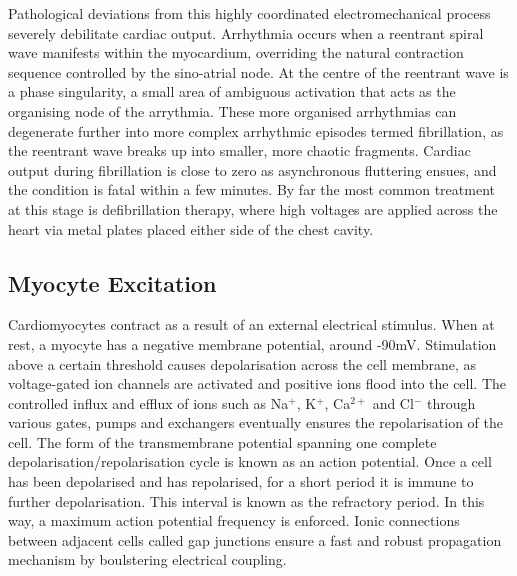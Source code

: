     Pathological deviations from this highly coordinated electromechanical process severely debilitate cardiac output. Arrhythmia occurs when a reentrant spiral wave manifests within the myocardium, overriding the natural contraction sequence controlled by the sino-atrial node. At the centre of the reentrant wave is a phase singularity, a small area of ambiguous activation that acts as the organising node of the arrythmia. These more organised arrhythmias can degenerate further into more complex arrhythmic episodes termed fibrillation, as the reentrant wave breaks up into smaller, more chaotic fragments. Cardiac output during fibrillation is close to zero as asynchronous fluttering ensues, and the condition is fatal within a few minutes. By far the most common treatment at this stage is defibrillation therapy, where high voltages are applied across the heart via metal plates placed either side of the chest cavity.
    
  \subsection{Myocyte Excitation}
  \label{sub:myocyte_excitation}
    Cardiomyocytes contract as a result of an external electrical stimulus. When at rest, a myocyte has a negative membrane potential, around -90mV. Stimulation above a certain threshold causes depolarisation across the cell membrane, as voltage-gated ion channels are activated and positive ions flood into the cell. The controlled influx and efflux of ions such as Na$^+$, K$^+$, Ca$^{2+}$ and Cl$^-$ through various gates, pumps and exchangers eventually ensures the repolarisation of the cell. The form of the transmembrane potential spanning one complete depolarisation/repolarisation cycle is known as an action potential. Once a cell has been depolarised and has repolarised, for a short period it is immune to further depolarisation. This interval is known as the refractory period. In this way, a maximum action potential frequency is enforced. Ionic connections between adjacent cells called gap junctions ensure a fast and robust propagation mechanism by boulstering electrical coupling.
  
